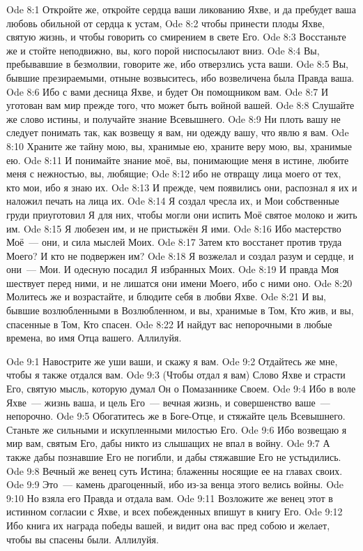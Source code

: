 \vs Ode 8:1
Откройте же,
откройте сердца ваши ликованию Яхве, и да пребудет ваша любовь обильной от
сердца к устам,
\vs Ode 8:2
чтобы принести
плоды Яхве, святую жизнь, и чтобы говорить со смирением в свете Его.
\vs Ode 8:3
Восстаньте же
и стойте неподвижно, вы, кого порой ниспосылают вниз.
\vs Ode 8:4
Вы,
пребывавшие в безмолвии, говорите же, ибо отверзлись уста ваши.
\vs Ode 8:5
Вы, бывшие
презираемыми, отныне возвыситесь, ибо возвеличена была Правда ваша.
\vs Ode 8:6
Ибо с вами
десница Яхве, и будет Он помощником вам.
\vs Ode 8:7
И уготован вам
мир прежде того, что может быть войной вашей.
\vs Ode 8:8
Слушайте же
слово истины, и получайте знание Всевышнего.
\vs Ode 8:9
Ни плоть вашу
не следует понимать так, как возвещу я вам, ни одежду вашу, что явлю я вам.
\vs Ode 8:10
Храните же
тайну мою, вы, хранимые ею, храните веру мою, вы, хранимые ею.
\vs Ode 8:11
И понимайте
знание моё, вы, понимающие меня в истине, любите меня с нежностью, вы, любящие;
\vs Ode 8:12
ибо не
отвращу лица моего от тех, кто мои, ибо я знаю их.
\vs Ode 8:13
И прежде, чем
появились они, распознал я их и наложил печать на лица их.
\vs Ode 8:14
Я создал
чресла их, и Мои собственные груди приуготовил Я для них, чтобы могли они испить
Моё святое молоко и жить им.
\vs Ode 8:15
Я любезен им,
и не пристыжён Я ими.
\vs Ode 8:16
Ибо
мастерство Моё~--- они, и сила мыслей Моих.
\vs Ode 8:17
Затем кто
восстанет против труда Моего? И кто не подвержен им?
\vs Ode 8:18
Я возжелал и
создал разум и сердце, и они~--- Мои. И одесную посадил Я избранных Моих.
\vs Ode 8:19
И правда Моя
шествует перед ними, и не лишатся они имени Моего, ибо с ними оно.
\vs Ode 8:20
Молитесь же и
возрастайте, и блюдите себя в любви Яхве.
\vs Ode 8:21
И вы, бывшие
возлюбленными в Возлюбленном, и вы, хранимые в Том, Кто жив, и вы, спасенные в
Том, Кто спасен.
\vs Ode 8:22
И найдут вас
непорочными в любые времена, во имя Отца вашего.
Аллилуйя.

\vs Ode 9:1
Навострите же
уши ваши, и скажу я вам.
\vs Ode 9:2
Отдайтесь же
мне, чтобы я также отдался вам.
\vs Ode 9:3
(Чтобы отдал я
вам) Слово Яхве и страсти Его, святую мысль, которую думал Он о Помазаннике
Своем.
\vs Ode 9:4
Ибо в воле
Яхве~--- жизнь ваша, и цель Его~--- вечная жизнь, и совершенство ваше~--- непорочно.
\vs Ode 9:5
Обогатитесь же
в Боге-Отце, и стяжайте цель Всевышнего. Станьте же сильными и искупленными
милостью Его.
\vs Ode 9:6
Ибо возвещаю я
мир вам, святым Его, дабы никто из слышащих не впал в войну.
\vs Ode 9:7
А также дабы
познавшие Его не погибли, и дабы стяжавшие Его не устыдились.
\vs Ode 9:8
Вечный же
венец суть Истина; блаженны носящие ее на главах своих.
\vs Ode 9:9
Это~--- камень
драгоценный, ибо из-за венца этого велись войны.
\vs Ode 9:10
Но взяла его
Правда и отдала вам.
\vs Ode 9:11
Возложите же
венец этот в истинном согласии с Яхве, и всех побежденных впишут в книгу Его.
\vs Ode 9:12
Ибо книга их
награда победы вашей, и видит она вас пред собою и желает, чтобы вы спасены
были.
Аллилуйя.

